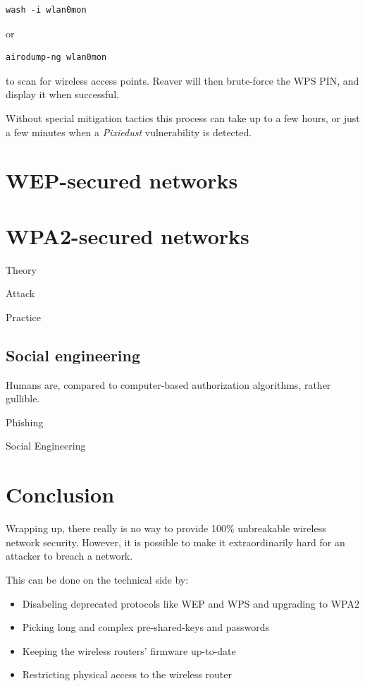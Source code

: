\begin{lstlisting}[basicstyle=\ttfamily]
wash -i wlan0mon
\end{lstlisting}

or

\begin{lstlisting}[basicstyle=\ttfamily]
airodump-ng wlan0mon
\end{lstlisting}

to scan for wireless access points. Reaver will then brute-force the WPS PIN, and display it when successful.

Without special mitigation tactics this process can take up to a few hours, or just a few minutes when a \emph{Pixiedust} vulnerability is detected.

\section{WEP-secured networks}

\section{WPA2-secured networks}

Theory

Attack

Practice

\subsection{Social engineering}\label{sec:attackuser}

Humans are, compared to computer-based authorization algorithms, rather gullible. 

Phishing

Social Engineering

\section{Conclusion}

Wrapping up, there really is no way to provide 100\% unbreakable wireless network security. However, it is possible to make it extraordinarily hard for an attacker to breach a network. 

This can be done on the technical side by:

\begin{itemize}

\item{Disabeling deprecated protocols like WEP and WPS and upgrading to WPA2}

\item{Picking long and complex pre-shared-keys and passwords}

\item{Keeping the wireless routers' firmware up-to-date}

\item{Restricting physical access to the wireless router}

\end{itemize}

